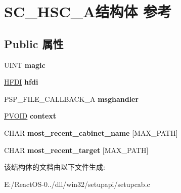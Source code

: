 \hypertarget{struct_s_c___h_s_c___a}{}\section{S\+C\+\_\+\+H\+S\+C\+\_\+\+A结构体 参考}
\label{struct_s_c___h_s_c___a}
\subsection*{Public 属性}
\begin{DoxyCompactItemize}
\item 
\mbox{\label{struct_s_c___h_s_c___a_a540640ed7b8a1ddf062e14f8447c7acf}} 
U\+I\+NT {\bfseries magic}
\item 
\mbox{\label{struct_s_c___h_s_c___a_a1dc3e7a51bfeb026cb546a458bf18155}} 
\hyperlink{interfacevoid}{H\+F\+DI} {\bfseries hfdi}
\item 
\mbox{\label{struct_s_c___h_s_c___a_a8c6c15c0c2a92761c36ddb3c2d69a91a}} 
P\+S\+P\+\_\+\+F\+I\+L\+E\+\_\+\+C\+A\+L\+L\+B\+A\+C\+K\+\_\+A {\bfseries msghandler}
\item 
\mbox{\label{struct_s_c___h_s_c___a_a32875405a7e2e1b6a02d5f67b6382d91}} 
\hyperlink{interfacevoid}{P\+V\+O\+ID} {\bfseries context}
\item 
\mbox{\label{struct_s_c___h_s_c___a_a01f18b9ed7d0326cb73620a0b9b57936}} 
C\+H\+AR {\bfseries most\+\_\+recent\+\_\+cabinet\+\_\+name} \mbox{[}M\+A\+X\+\_\+\+P\+A\+TH\mbox{]}
\item 
\mbox{\label{struct_s_c___h_s_c___a_ad24745f163f9367a7a04d4e1eb14254c}} 
C\+H\+AR {\bfseries most\+\_\+recent\+\_\+target} \mbox{[}M\+A\+X\+\_\+\+P\+A\+TH\mbox{]}
\end{DoxyCompactItemize}


该结构体的文档由以下文件生成\+:\begin{DoxyCompactItemize}
\item 
E\+:/\+React\+O\+S-\/0../dll/win32/setupapi/setupcab.\+c\end{DoxyCompactItemize}

